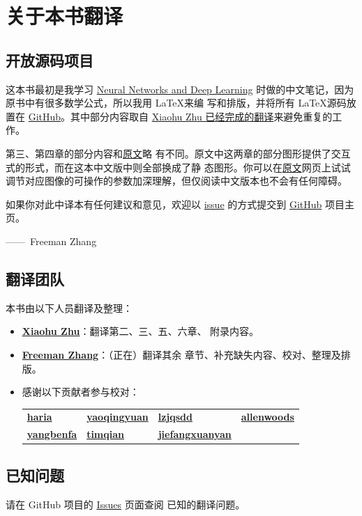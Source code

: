 
\chapter{关于本书翻译}
\label{ch:TranslationTeam}

\section*{开放源码项目}

这本书最初是我学习
\href{http://neuralnetworksanddeeplearning.com/index.html}{Neural Networks and
  Deep Learning} 时做的中文笔记，因为原书中有很多数学公式，所以我用 \LaTeX 来编
写和排版，并将所有 \LaTeX 源码放置在
\href{https://github.com/zhanggyb/nndl}{GitHub}。其中部分内容取自
\href{https://github.com/tigerneil/neural-networks-and-deep-learning-zh-cn}{Xiaohu
  Zhu 已经完成的翻译}来避免重复的工作。

第三、第四章的部分内容和\href{http://neuralnetworksanddeeplearning.com}{原文}略
有不同。原文中这两章的部分图形提供了交互式的形式，而在这本中文版中则全部换成了静
态图形。你可以在\href{http://neuralnetworksanddeeplearning.com}{原文}网页上试试
调节对应图像的可操作的参数加深理解，但仅阅读中文版本也不会有任何障碍。

如果你对此中译本有任何建议和意见，欢迎以
\href{https://github.com/zhanggyb/nndl/issues}{issue} 的方式提交到
\href{https://github.com/zhanggyb/nndl}{GitHub} 项目主页。

\begin{flushright}
  ——~Freeman Zhang
\end{flushright}

\section*{翻译团队}
\label{sec:TranslationTeam}

本书由以下人员翻译及整理：

\begin{itemize}
\item \textbf{\href{mailto:xhzhu.nju@gmail}{Xiaohu Zhu}}：翻译第二、三、五、六章、
  附录内容。
\item \textbf{\href{mailto:zhanggyb@gmail.com}{Freeman Zhang}}：（正在）翻译其余
  章节、补充缺失内容、校对、整理及排版。
\item 感谢以下贡献者参与校对：\\
    \small
    \begin{tabular}{l l l l}
      \bfseries\href{https://github.com/haria}{haria} 
      & \bfseries\href{https://github.com/yaoqingyuan}{yaoqingyuan}
      & \bfseries\href{https://github.com/lzjqsdd}{lzjqsdd}
      & \bfseries\href{https://github.com/allenwoods}{allenwoods} \\
      \bfseries\href{https://github.com/yangbenfa}{yangbenfa}
      & \bfseries\href{https://github.com/timqian}{timqian}
      & \bfseries\href{https://github.com/jiefangxuanyan}{jiefangxuanyan}
      & \\
    \end{tabular}
    \normalsize
\end{itemize}

\section*{已知问题}
\label{sec:KnownIssues}

请在 GitHub 项目的 \href{https://github.com/zhanggyb/nndl/issues}{Issues} 页面查阅
已知的翻译问题。
